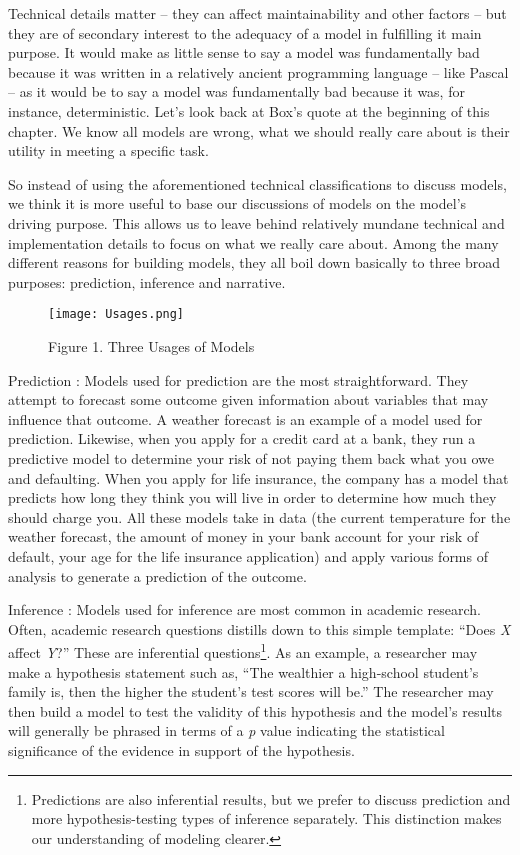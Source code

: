\documentclass[]{memoir}
\let\Oldincludegraphics\includegraphics
\renewcommand{\includegraphics}[1]{\Oldincludegraphics[max size={\textwidth}{\textheight}]{#1}}
\begin{document}
Technical details matter -- they can affect maintainability and other
factors -- but they are of secondary interest to the adequacy of a model
in fulfilling it main purpose. It would make as little sense to say a
model was fundamentally bad because it was written in a relatively
ancient programming language -- like Pascal -- as it would be to say a
model was fundamentally bad because it was, for instance, deterministic.
Let's look back at Box's quote at the beginning of this chapter. We know
all models are wrong, what we should really care about is their utility
in meeting a specific task.

So instead of using the aforementioned technical classifications to
discuss models, we think it is more useful to base our discussions of
models on the model's driving purpose. This allows us to leave behind
relatively mundane technical and implementation details to focus on what
we really care about. Among the many different reasons for building
models, they all boil down basically to three broad purposes:
prediction, inference and narrative.

\begin{figure}[htbp]
\centering
\texttt{[image: Usages.png]}
\caption{Figure 1. Three Usages of Models}
\end{figure}

Prediction : Models used for prediction are the most straightforward.
They attempt to forecast some outcome given information about variables
that may influence that outcome. A weather forecast is an example of a
model used for prediction. Likewise, when you apply for a credit card at
a bank, they run a predictive model to determine your risk of not paying
them back what you owe and defaulting. When you apply for life
insurance, the company has a model that predicts how long they think you
will live in order to determine how much they should charge you. All
these models take in data (the current temperature for the weather
forecast, the amount of money in your bank account for your risk of
default, your age for the life insurance application) and apply various
forms of analysis to generate a prediction of the outcome.

Inference : Models used for inference are most common in academic
research. Often, academic research questions distills down to this
simple template: ``Does \emph{X} affect \emph{Y}?'' These are
inferential questions\footnote{Predictions are also inferential results,
  but we prefer to discuss prediction and more hypothesis-testing types
  of inference separately. This distinction makes our understanding of
  modeling clearer.}. As an example, a researcher may make a hypothesis
statement such as, ``The wealthier a high-school student's family is,
then the higher the student's test scores will be.'' The researcher may
then build a model to test the validity of this hypothesis and the
model's results will generally be phrased in terms of a \emph{p} value
indicating the statistical significance of the evidence in support of
the hypothesis.
\end{document}
